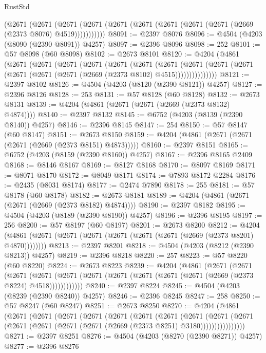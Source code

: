 \begin{lexlean}{RustStd}
\begin{coremodule}
      (@2671
        (@2671
          (@2671 (@2671 (@2671 (@2671 (@2671 (@2671 (@2671 (@2669 (@2373 @8076) @4519)))))))))))
@8091 := @2397 @8076
@8096 := @4504 (@4203 (@8090 (@2390 @8091)) @4257)
@8097 := @2396 @8096
@8098 := 252
@8101 := @57 @8098 (@60 @8098)
@8102 := @2673 @8101
@8120 := @4204
    (@4861
      (@2671
        (@2671
          (@2671
            (@2671
              (@2671
                (@2671
                  (@2671
                    (@2671
                      (@2671 (@2671 (@2671 (@2671 (@2671 (@2669 (@2373 @8102) @4515)))))))))))))))
@8121 := @2397 @8102
@8126 := @4504 (@4203 (@8120 (@2390 @8121)) @4257)
@8127 := @2396 @8126
@8128 := 253
@8131 := @57 @8128 (@60 @8128)
@8132 := @2673 @8131
@8139 := @4204 (@4861 (@2671 (@2671 (@2669 (@2373 @8132) @4874))))
@8140 := @2397 @8132
@8145 := @6752 (@4203 (@8139 (@2390 @8140)) @4257)
@8146 := @2396 @8145
@8147 := 254
@8150 := @57 @8147 (@60 @8147)
@8151 := @2673 @8150
@8159 := @4204 (@4861 (@2671 (@2671 (@2671 (@2669 (@2373 @8151) @4873)))))
@8160 := @2397 @8151
@8165 := @6752 (@4203 (@8159 (@2390 @8160)) @4257)
@8167 := @2396 @8165 @2409
@8168 := @8146 @8167
@8169 := @8127 @8168
@8170 := @8097 @8169
@8171 := @8071 @8170
@8172 := @8049 @8171
@8174 := @7893 @8172 @2284
@8176 := @2435 (@8031 @8174)
@8177 := @2474 @7890
@8178 := 255
@8181 := @57 @8178 (@60 @8178)
@8182 := @2673 @8181
@8189 := @4204 (@4861 (@2671 (@2671 (@2669 (@2373 @8182) @4874))))
@8190 := @2397 @8182
@8195 := @4504 (@4203 (@8189 (@2390 @8190)) @4257)
@8196 := @2396 @8195
@8197 := 256
@8200 := @57 @8197 (@60 @8197)
@8201 := @2673 @8200
@8212 := @4204 (@4861 (@2671 (@2671 (@2671 (@2671 (@2671 (@2671 (@2669 (@2373 @8201) @4870))))))))
@8213 := @2397 @8201
@8218 := @4504 (@4203 (@8212 (@2390 @8213)) @4257)
@8219 := @2396 @8218
@8220 := 257
@8223 := @57 @8220 (@60 @8220)
@8224 := @2673 @8223
@8239 := @4204
    (@4861
      (@2671
        (@2671
          (@2671
            (@2671 (@2671 (@2671 (@2671 (@2671 (@2671 (@2671 (@2669 (@2373 @8224) @4518))))))))))))
@8240 := @2397 @8224
@8245 := @4504 (@4203 (@8239 (@2390 @8240)) @4257)
@8246 := @2396 @8245
@8247 := 258
@8250 := @57 @8247 (@60 @8247)
@8251 := @2673 @8250
@8270 := @4204
    (@4861
      (@2671
        (@2671
          (@2671
            (@2671
              (@2671
                (@2671
                  (@2671
                    (@2671
                      (@2671
                        (@2671
                          (@2671 (@2671 (@2671 (@2671 (@2669 (@2373 @8251) @3180))))))))))))))))
@8271 := @2397 @8251
@8276 := @4504 (@4203 (@8270 (@2390 @8271)) @4257)
@8277 := @2396 @8276

\end{coremodule}
\end{lexlean}
